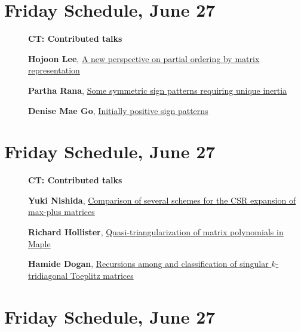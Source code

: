 \documentclass[ILAS2025-program.tex]{subfiles}
\begin{document}
    \newpage

\section*{Friday Schedule, June 27 }
        
        \begin{description}
    \item[] {\color{mstitle}\textbf{CT: Contributed talks}} 
    \item[] \hypertarget{up0395}{}\textbf{Hojoon Lee}, \hyperlink{down0395}{A new perspective on partial ordering by matrix representation}
        \item[] \hypertarget{up0396}{}\textbf{Partha Rana}, \hyperlink{down0396}{Some symmetric sign patterns requiring unique inertia}
        \item[] \hypertarget{up0397}{}\textbf{Denise Mae Go}, \hyperlink{down0397}{Initially positive sign patterns}
        \end{description}
    \newpage

\section*{Friday Schedule, June 27 }
        
        \begin{description}
    \item[] {\color{mstitle}\textbf{CT: Contributed talks}} 
    \item[] \hypertarget{up0398}{}\textbf{Yuki Nishida}, \hyperlink{down0398}{Comparison of several schemes for the CSR expansion of max-plus matrices}
        \item[] \hypertarget{up0399}{}\textbf{Richard Hollister}, \hyperlink{down0399}{Quasi-triangularization of matrix polynomials in Maple}
        \item[] \hypertarget{up0400}{}\textbf{Hamide Dogan}, \hyperlink{down0400}{Recursions among and classification of singular $k$-tridiagonal Toeplitz matrices}
        \end{description}
    \newpage

\section*{Friday Schedule, June 27 }
        
\end{document}
